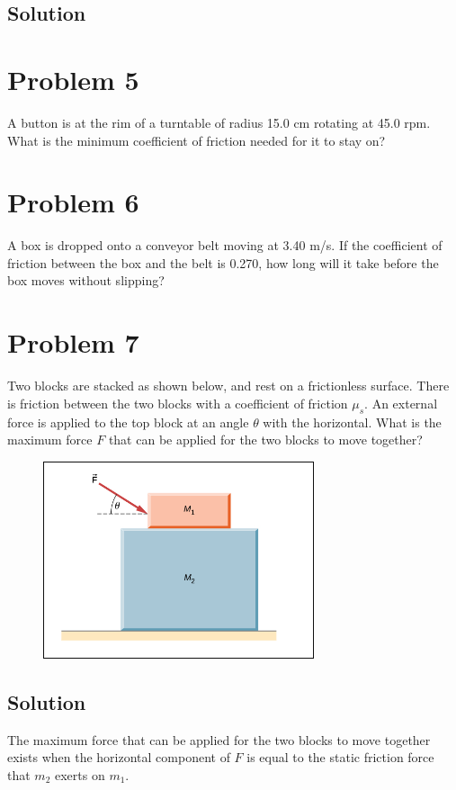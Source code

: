 \documentclass{article}
\begin{document}
\subsection*{Solution}

\section*{Problem 5}
A button is at the rim of a turntable of radius 15.0 cm rotating at 45.0 rpm. What is the
minimum coefficient of friction needed for it to stay on?

\section*{Problem 6}
A box is dropped onto a conveyor belt moving at 3.40 m/s. If the coefficient of friction
between the box and the belt is 0.270, how long will it take before the box moves without
slipping?

\section*{Problem 7}
Two blocks are stacked as shown below, and rest on a frictionless surface. There is friction
between the two blocks with a coefficient of friction $\mu_s$. An external force is applied to the top
block at an angle $\theta$ with the horizontal. What is the maximum force $F$ that can be applied for
the two blocks to move together?

\begin{figure}[ht]
    \centering
    \includegraphics[scale=.5]{drawing-2.png}
\end{figure}

\subsection*{Solution}
The maximum force that can be applied for the two blocks to move together exists when the horizontal component of $F$ is equal to the static friction force that $m_2$ exerts on $m_1$.
\end{document}
